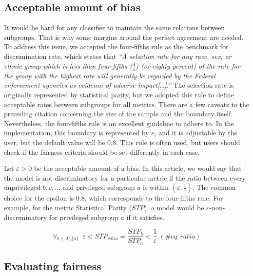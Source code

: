 \hypertarget{bias}{%
\subsection{Acceptable amount of bias}\label{bias}}

It would be hard for any classifier to maintain the same relations
between subgroups. That is why some margins around the perfect agreement
are needed. To address this issue, we accepted the four-fifths rule
\citep{adverseimpact} as the benchmark for discrimination rate, which
states that \emph{``A selection rate for any race, sex, or ethnic group
which is less than four-fifths (\emph{\(\frac{4}{5}\)}) (or eighty
percent) of the rate for the group with the highest rate will generally
be regarded by the Federal enforcement agencies as evidence of adverse
impact{[}\ldots{]}.''} The selection rate is originally represented by
statistical parity, but we adopted this rule to define acceptable rates
between subgroups for all metrics. There are a few caveats to the
preceding citation concerning the size of the sample and the boundary
itself. Nevertheless, the four-fifths rule is an excellent guideline to
adhere to. In the implementation, this boundary is represented by
\(\varepsilon\), and it is adjustable by the user, but the default value
will be 0.8. This rule is often used, but users should check if the
fairness criteria should be set differently in each case.

Let \(\varepsilon > 0\) be the acceptable amount of a bias. In this
article, we would say that the model is not discriminatory for a
particular metric if the ratio between every unprivileged \(b, c, ...\)
and privileged subgroup \(a\) is within
\((\varepsilon, \frac{1}{\varepsilon})\). The common choice for the
epsilon is 0.8, which corresponds to the four-fifths rule. For example,
for the metric Statistical Parity (\(STP\)), a model would be
\(\varepsilon\)-non-discriminatory for privileged subgroup \(a\) if it
satisfies.

\begin{equation} 
\forall_{b \in A \setminus \{a\}} \;\;
   \varepsilon < STP_{ratio} = \frac{STP_b}{STP_a} < \frac{1}{\varepsilon}.
   \label{eq:ratio}
  (\#eq:ratio)
\end{equation}

\hypertarget{evaluating-fairness}{%
\subsection{Evaluating fairness}\label{evaluating-fairness}}

